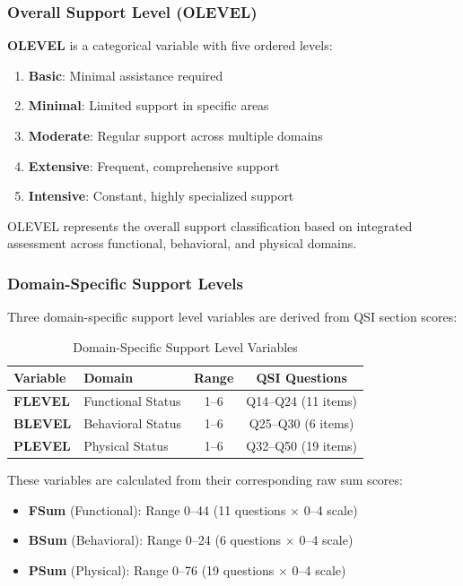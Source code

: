 \subsubsection{Overall Support Level (OLEVEL)}

\textbf{OLEVEL} is a categorical variable with five ordered levels:

\begin{enumerate}
    \item \textbf{Basic}: Minimal assistance required
    \item \textbf{Minimal}: Limited support in specific areas
    \item \textbf{Moderate}: Regular support across multiple domains
    \item \textbf{Extensive}: Frequent, comprehensive support
    \item \textbf{Intensive}: Constant, highly specialized support
\end{enumerate}

OLEVEL represents the overall support classification based on integrated assessment across functional, behavioral, and physical domains.

\subsubsection{Domain-Specific Support Levels}

Three domain-specific support level variables are derived from QSI section scores:

\begin{table}[H]
\centering
\caption{Domain-Specific Support Level Variables}
\begin{tabular}{llcc}
\toprule
\textbf{Variable} & \textbf{Domain} & \textbf{Range} & \textbf{QSI Questions} \\
\midrule
\textbf{FLEVEL} & Functional Status & 1--6 & Q14--Q24 (11 items) \\
\textbf{BLEVEL} & Behavioral Status & 1--6 & Q25--Q30 (6 items) \\
\textbf{PLEVEL} & Physical Status & 1--6 & Q32--Q50 (19 items) \\
\bottomrule
\end{tabular}
\label{tab:domain-support-levels}
\end{table}

These variables are calculated from their corresponding raw sum scores:
\begin{itemize}
    \item \textbf{FSum} (Functional): Range 0--44 (11 questions $\times$ 0--4 scale)
    \item \textbf{BSum} (Behavioral): Range 0--24 (6 questions $\times$ 0--4 scale)
    \item \textbf{PSum} (Physical): Range 0--76 (19 questions $\times$ 0--4 scale)
\end{itemize}

